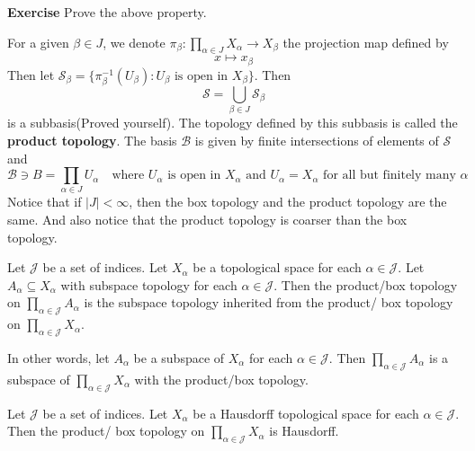 \documentclass[main.tex]{subfiles}
\begin{document}
\par \noindent \textbf{Exercise} Prove the above property.  

\begin{definition}
    For a given $\beta \in J$, we denote $\pi_{\beta}: \prod_{\alpha \in J} X_{\alpha} \rightarrow X_{\beta}$ the projection map defined by 
    \begin{equation}
        x \mapsto x_{\beta}
    \end{equation}
    Then let $\mathcal{S}_{\beta} = \{ \pi_{\beta}^{-1}(U_{\beta}) : U_{\beta} \text{ is open in } X_{\beta} \}$. Then 
    \begin{equation}
        \mathcal{S} = \bigcup_{\beta \in J} \mathcal{S}_{\beta}
    \end{equation}
    is a subbasis(Proved yourself). The topology defined by this subbasis is called the \textbf{product topology}. The basis 
    $\mathcal{B}$ is given by finite intersections of elements of $\mathcal{S}$ and 
    \begin{equation}
        \mathcal{B} \ni B = \prod_{\alpha \in J} U_{\alpha} \quad \text{where } U_{\alpha} \text{ is open in } X_{\alpha} \text{ and } U_{\alpha} = X_{\alpha} \text{ for all but finitely many } \alpha 
    \end{equation}
    Notice that if $|J| < \infty$, then the box topology and the product topology are the same. And also notice that the product topology is coarser than the box topology. 
\end{definition}

\begin{theorem}
    Let $\mathcal{J}$ be a set of indices. Let $X_{\alpha}$ be a topological space for each $\alpha \in \mathcal{J}$. Let $A_{\alpha} \subseteq X_{\alpha}$ with subspace topology for each $\alpha \in \mathcal{J}$. Then the product/box topology on $\prod_{\alpha \in \mathcal{J}} A_{\alpha}$ is the subspace topology inherited from the product/ box topology on $\prod_{\alpha \in \mathcal{J}} X_{\alpha}$. 
    \par In other words, let $A_{\alpha}$ be a subspace of $X_{\alpha}$ for each $\alpha \in \mathcal{J}$. Then $\prod_{\alpha \in \mathcal{J}} A_{\alpha}$ is a subspace of $\prod_{\alpha \in \mathcal{J}} X_{\alpha}$ with the product/box topology.  
\end{theorem}

\begin{theorem}
    Let $\mathcal{J}$ be a set of indices. Let $X_{\alpha}$ be a Hausdorff topological space for each $\alpha \in \mathcal{J}$. Then the product/ box topology on $\prod_{\alpha \in \mathcal{J}} X_{\alpha}$ is Hausdorff.
\end{theorem}
\end{document}
